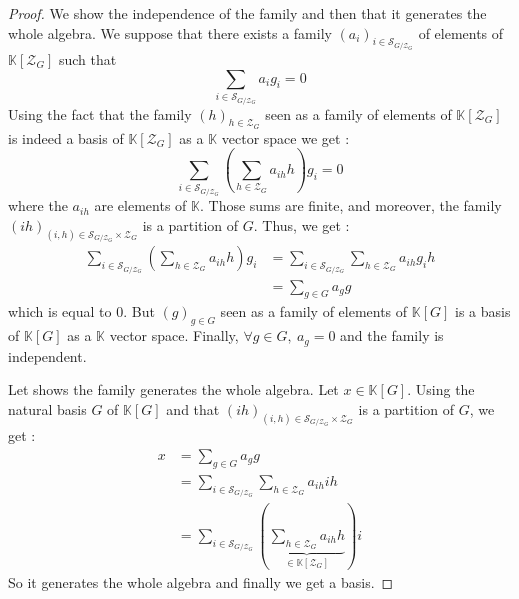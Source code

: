 \begin{proof}
    \leanok
    We show the independence of the family and then that it generates the whole algebra.
    \newline
    We suppose that there exists a family $(a_i)_{i\in \mathcal{S}_{G/\mathcal{Z}_G}}$ of elements
    of $\mathbb{K}[\mathcal{Z}_G]$ such that
    \begin{equation*}
        \sum\limits_{i\in\mathcal{S}_{G/\mathcal{Z}_G}}a_i g_i=0
    \end{equation*}
    Using the fact that the family $(h)_{h\in\mathcal{Z}_G}$ seen as a family of elements
    of $\mathbb{K}[\mathcal{Z}_G]$ is indeed a basis of $\mathbb{K}[\mathcal{Z}_G]$ as 
    a $\mathbb{K}$ vector space we get :
    \begin{equation*}
        \sum\limits_{i\in\mathcal{S}_{G/\mathcal{Z}_G}}\left(\sum\limits_{h\in\mathcal{Z}_G}a_{ih}h\right) g_i=0
    \end{equation*}
    where the $a_{ih}$ are elements of $\mathbb{K}$. Those sums are finite, and moreover, 
    the family $(ih)_{(i,h)\in \mathcal{S}_{G/\mathcal{Z}_G}\times \mathcal{Z}_G}$ is a partition
    of $G$.
    \newline
    Thus, we get :
    \begin{align*}
        \sum\limits_{i\in\mathcal{S}_{G/\mathcal{Z}_G}}\left(\sum\limits_{h\in\mathcal{Z}_G}a_{ih}h\right) g_i &= \sum\limits_{i\in\mathcal{S}_{G/\mathcal{Z}_G}}\sum\limits_{h\in\mathcal{Z}_G}a_{ih}g_ih\\
        &=\sum\limits_{g\in G}a_g g 
    \end{align*}
    which is equal to 0. But $(g)_{g\in G}$ seen as a family of elements of $\mathbb{K}[G]$ is a 
    basis of $\mathbb{K}[G]$ as a $\mathbb{K}$ vector space. Finally, $\forall g\in G,\ a_g=0$ and the family is independent.
    \newline

    Let shows the family generates the whole algebra. Let $x\in \mathbb{K}[G]$.
    Using the natural basis $G$ of $\mathbb{K}[G]$ and that $(ih)_{(i,h)\in \mathcal{S}_{G/\mathcal{Z}_G}\times \mathcal{Z}_G}$ is a partition
    of $G$, we get : 
    \begin{align*}
        x&=\sum\limits_{g\in G}a_gg\\
        &=\sum\limits_{i\in\mathcal{S}_{G/\mathcal{Z}_G}}\sum\limits_{h\in \mathcal{Z}_G} a_{ih} ih\\
        &=\sum\limits_{i\in\mathcal{S}_{G/\mathcal{Z}_G}}\left(\underbrace{\sum\limits_{h\in \mathcal{Z}_G} a_{ih} h}_{\in\mathbb{K}[\mathcal{Z}_G]}\right) i
    \end{align*}
    So it generates the whole algebra and finally we get a basis.
\end{proof}


